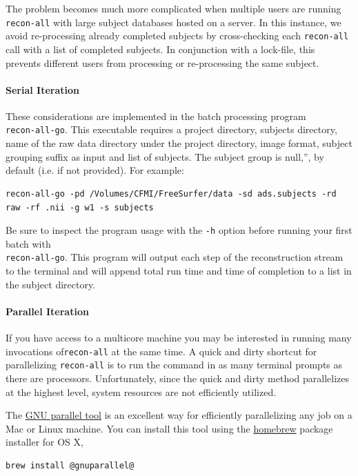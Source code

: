 \documentclass[paper=a4, fontsize=11pt]{scrartcl} %
\numberwithin{equation}{section} %
\numberwithin{figure}{section} %
\numberwithin{table}{section} %
\begin{document}
The problem becomes much more complicated when multiple users are running \texttt{recon-all} with large subject databases hosted on a server.  In this instance, we avoid re-processing already completed subjects  by cross-checking each \texttt{recon-all} call with a list of completed subjects. In conjunction with a lock-file, this prevents different users from processing or re-processing the same subject.

\paragraph{Serial Iteration} These considerations are implemented in the batch processing program ~\\\texttt{recon-all-go}.  This executable requires a project directory, subjects directory, name of the raw data directory under the project directory, image format, subject grouping suffix as input and list of subjects.  The subject group is null,'', by default (i.e. if not provided). For example:

\begin{lstlisting}
recon-all-go -pd /Volumes/CFMI/FreeSurfer/data -sd ads.subjects -rd raw -rf .nii -g w1 -s subjects
\end{lstlisting}

Be sure to inspect the program usage with the \texttt{-h} option before running your first batch with ~\\ \texttt{recon-all-go}.  This program will output each step of the reconstruction stream to the terminal and will append total run time and time of completion to a list in the subject directory.

\paragraph{Parallel Iteration} If you have access to a multicore machine you may be interested in running many invocations  of\texttt{recon-all} at the same time.  A quick and dirty shortcut for parallelizing \texttt{recon-all} is to run the command in as many terminal prompts as there are processors.  Unfortunately, since the quick and dirty method parallelizes at the highest level, system resources are not efficiently utilized.  

The \href{https://www.gnu.org/software/parallel/}{GNU parallel tool} is an excellent way for efficiently parallelizing any job on a Mac or Linux machine.  You can install this tool using the \href{http://brew.sh}{homebrew} package installer for OS X,
\begin{lstlisting}
brew install @gnuparallel@
\end{lstlisting}
\end{document}
